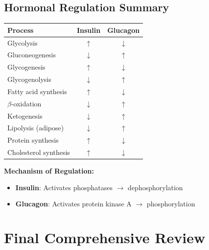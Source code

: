 \subsection{Hormonal Regulation Summary}

\begin{tcolorbox}[colback=orange!5, colframe=orange!70!black, title=\textbf{Insulin vs. Glucagon: Metabolic Effects}]

\begin{center}
\begin{tabular}{p{5cm}cc}
\toprule
\textbf{Process} & \textbf{Insulin} & \textbf{Glucagon} \\
\midrule
Glycolysis & $\uparrow$ & $\downarrow$ \\
Gluconeogenesis & $\downarrow$ & $\uparrow$ \\
Glycogenesis & $\uparrow$ & $\downarrow$ \\
Glycogenolysis & $\downarrow$ & $\uparrow$ \\
Fatty acid synthesis & $\uparrow$ & $\downarrow$ \\
$\beta$-oxidation & $\downarrow$ & $\uparrow$ \\
Ketogenesis & $\downarrow$ & $\uparrow$ \\
Lipolysis (adipose) & $\downarrow$ & $\uparrow$ \\
Protein synthesis & $\uparrow$ & $\downarrow$ \\
Cholesterol synthesis & $\uparrow$ & $\downarrow$ \\
\bottomrule
\end{tabular}
\end{center}

\textbf{Mechanism of Regulation:}
\begin{itemize}
    \item \textbf{Insulin}: Activates phosphatases $\rightarrow$ dephosphorylation
    \item \textbf{Glucagon}: Activates protein kinase A $\rightarrow$ phosphorylation
\end{itemize}
\end{tcolorbox}


\section{Final Comprehensive Review}

